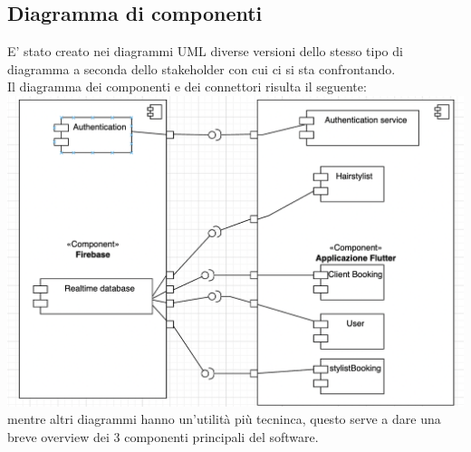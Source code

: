 \documentclass{article}
\begin{document}
\subsection{Diagramma di componenti} 
E' stato creato nei diagrammi UML diverse versioni dello stesso tipo di diagramma a seconda dello stakeholder
con cui ci si sta confrontando.
\\Il diagramma dei componenti e dei connettori risulta il seguente:
\\\includegraphics[scale = 0.45]{"Immagini/SoftArch.png"}
\\ mentre altri diagrammi hanno un'utilità più tecninca, questo serve a dare una breve overview dei 3 componenti principali del software.
\end{document}
